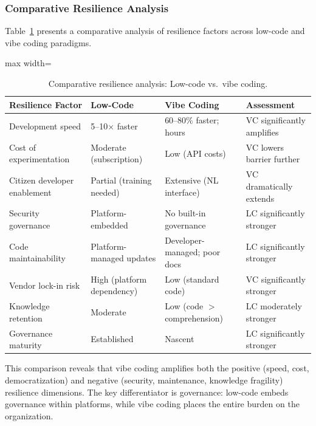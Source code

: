 \documentclass[preprint,12pt,authoryear]{elsarticle}
\begin{document}
\subsubsection{Comparative Resilience Analysis}

Table~\ref{tab:resilience} presents a comparative analysis of resilience factors across low-code and vibe coding paradigms.

\begin{table}[htbp]
\centering
\caption{Comparative resilience analysis: Low-code vs.\ vibe coding.}
\label{tab:resilience}
\small
\begin{adjustbox}{max width=\textwidth}
\begin{tabular}{@{}p{3.3cm}p{3.5cm}p{3.5cm}p{3.5cm}@{}}
\toprule
\textbf{Resilience Factor} & \textbf{Low-Code} & \textbf{Vibe Coding} & \textbf{Assessment} \\
\midrule
Development speed & 5--10$\times$ faster & 60--80\% faster; hours & VC significantly amplifies \\
\addlinespace
Cost of experimentation & Moderate (subscription) & Low (API costs) & VC lowers barrier further \\
\addlinespace
Citizen developer enablement & Partial (training needed) & Extensive (NL interface) & VC dramatically extends \\
\addlinespace
Security governance & Platform-embedded & No built-in governance & LC significantly stronger \\
\addlinespace
Code maintainability & Platform-managed updates & Developer-managed; poor docs & LC significantly stronger \\
\addlinespace
Vendor lock-in risk & High (platform dependency) & Low (standard code) & VC significantly stronger \\
\addlinespace
Knowledge retention & Moderate & Low (code $>$ comprehension) & LC moderately stronger \\
\addlinespace
Governance maturity & Established & Nascent & LC significantly stronger \\
\bottomrule
\end{tabular}
\end{adjustbox}
\end{table}

This comparison reveals that vibe coding amplifies both the positive (speed, cost, democratization) and negative (security, maintenance, knowledge fragility) resilience dimensions. The key differentiator is governance: low-code embeds governance within platforms, while vibe coding places the entire burden on the organization.
\end{document}
